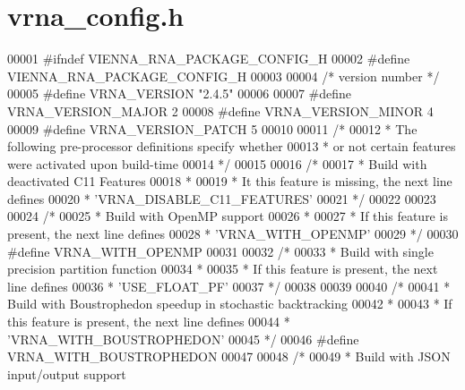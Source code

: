\hypertarget{vrna__config_8h_source}{}\section{vrna\+\_\+config.\+h}
\label{vrna__config_8h_source}

\begin{DoxyCode}
00001 \textcolor{preprocessor}{#ifndef VIENNA\_RNA\_PACKAGE\_CONFIG\_H}
00002 \textcolor{preprocessor}{#define VIENNA\_RNA\_PACKAGE\_CONFIG\_H}
00003 
00004 \textcolor{comment}{/* version number */}
00005 \textcolor{preprocessor}{#define VRNA\_VERSION  "2.4.5"}
00006 
00007 \textcolor{preprocessor}{#define VRNA\_VERSION\_MAJOR  2}
00008 \textcolor{preprocessor}{#define VRNA\_VERSION\_MINOR  4}
00009 \textcolor{preprocessor}{#define VRNA\_VERSION\_PATCH  5}
00010 
00011 \textcolor{comment}{/*}
00012 \textcolor{comment}{ * The following pre-processor definitions specify whether}
00013 \textcolor{comment}{ * or not certain features were activated upon build-time}
00014 \textcolor{comment}{ */}
00015 
00016 \textcolor{comment}{/*}
00017 \textcolor{comment}{ * Build with deactivated C11 Features}
00018 \textcolor{comment}{ *}
00019 \textcolor{comment}{ * It this feature is missing, the next line defines}
00020 \textcolor{comment}{ * 'VRNA\_DISABLE\_C11\_FEATURES'}
00021 \textcolor{comment}{ */}
00022 
00023 
00024 \textcolor{comment}{/*}
00025 \textcolor{comment}{ * Build with OpenMP support}
00026 \textcolor{comment}{ *}
00027 \textcolor{comment}{ * If this feature is present, the next line defines}
00028 \textcolor{comment}{ * 'VRNA\_WITH\_OPENMP'}
00029 \textcolor{comment}{ */}
00030 \textcolor{preprocessor}{#define VRNA\_WITH\_OPENMP}
00031 
00032 \textcolor{comment}{/*}
00033 \textcolor{comment}{ * Build with single precision partition function}
00034 \textcolor{comment}{ *}
00035 \textcolor{comment}{ * If this feature is present, the next line defines}
00036 \textcolor{comment}{ * 'USE\_FLOAT\_PF'}
00037 \textcolor{comment}{ */}
00038 
00039 
00040 \textcolor{comment}{/*}
00041 \textcolor{comment}{ * Build with Boustrophedon speedup in stochastic backtracking}
00042 \textcolor{comment}{ *}
00043 \textcolor{comment}{ * If this feature is present, the next line defines}
00044 \textcolor{comment}{ * 'VRNA\_WITH\_BOUSTROPHEDON'}
00045 \textcolor{comment}{ */}
00046 \textcolor{preprocessor}{#define VRNA\_WITH\_BOUSTROPHEDON}
00047 
00048 \textcolor{comment}{/*}
00049 \textcolor{comment}{ * Build with JSON input/output support}

\end{DoxyCode}
